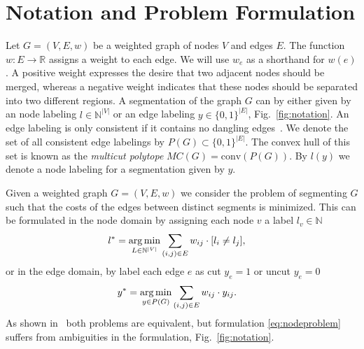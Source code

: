 \section{Notation and Problem Formulation}\label{sec:problem_formulation}
Let $G=(V,E, w)$ be a weighted graph of nodes $V$ and edges $E$.
%
The function $w : E \rightarrow \mathbb{R}$ assigns a weight to each edge.
We will use $w_e$ as a shorthand for $w(e)$.
A positive weight expresses the desire that two adjacent nodes should
be merged, whereas a negative weight indicates
that these nodes should be separated into two different regions.
%
%
%
A segmentation of the graph $G$ can by either given by an 
node labeling $l \in \mathbb{N}^{|V|}$
or an edge labeling $y \in\{0,1\}^{|E|}$, \cf Fig.~\ref{fig:notation}.
An edge labeling is only consistent if it contains no dangling edges~\cite{kappes_2013_arxiv}.
We denote the set of all consistent edge labelings by $P(G)\subset\{0,1\}^{|E|}$.
The convex hull of this set is known as the \emph{multicut polytope} $MC(G) = \textrm{conv}(P(G))$.
%
By $l(y)$ we denote a node labeling for a segmentation given by $y$.

Given a weighted graph $G=(V,E,w)$ we consider the problem of segmenting $G$ such that the costs
of the edges between distinct segments is minimized. This can be formulated in the node domain
by assigning each node $v$ a label $l_v \in \mathbb{N}$
\begin{align}
  l^* &= \operatorname*{arg\,min}_{L \in \mathbb{N}^{|V|}} \sum_{ (i,j) \in E } w_{ij} \cdot [l_{i} \neq l_{j}], \label{eq:nodeproblem}
\end{align} 
or in the edge domain, by label each edge $e$ as cut $y_e=1$ or uncut $y_e=0$ 
\begin{align}
  y^* &= \argmin_{y \in P(G)} \sum_{ (i,j) \in E } w_{ij} \cdot y_{ij} \label{eq:edgeproblem}.%
\end{align}
As shown in~\cite{kappes_2013_arxiv}  both problems are equivalent, but formulation \ref{eq:nodeproblem}
suffers from ambiguities in the formulation, \cf Fig.~\ref{fig:notation}. 

%
